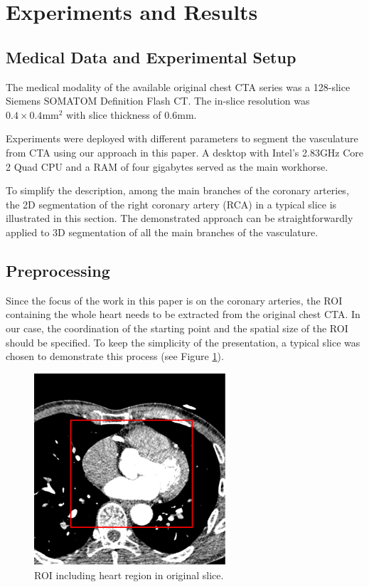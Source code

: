\section{Experiments and Results}
\label{sec:coronary_experiments}

\subsection{Medical Data and Experimental Setup}
\label{subsec:coronary_setup_data}

The medical modality of the available original chest CTA series was a 128-slice Siemens SOMATOM Definition Flash CT.
The in-slice resolution was $0.4 \times 0.4 \text{mm}^2$ with slice thickness of $0.6 \text{mm}$.

Experiments were deployed with different parameters to segment the vasculature from CTA using our approach in this paper.
A desktop with Intel's 2.83GHz Core 2 Quad CPU and a RAM of four gigabytes served as the main workhorse.

To simplify the description, among the main branches of the coronary arteries, the 2D segmentation of the right coronary artery (RCA) in a typical slice is illustrated in this section.
The demonstrated approach can be straightforwardly applied to 3D segmentation of all the main branches of the vasculature.

\subsection{Preprocessing}

Since the focus of the work in this paper is on the coronary arteries, the ROI containing the whole heart needs to be extracted from the original chest CTA.
In our case, the coordination of the starting point and the spatial size of the ROI should be specified.
To keep the simplicity of the presentation, a typical slice was chosen to demonstrate this process (see Figure \ref{fig:coronary_ROI}).
\begin{figure}[!tb]
\centering
\includegraphics[width=2.8in]{Figures/coronary/ROI_Extraction}
\caption{ROI including heart region in original slice.}
\label{fig:coronary_ROI}
\end{figure}

